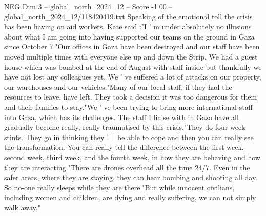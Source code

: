 \begin{textsample}{NEG Dim 3 – global\_north\_2024\_12 – Score -1.00 – global\_north\_2024\_12/118420419.txt}
Speaking of the emotional toll the crisis has been having on aid workers, Kate said :"I ' m under absolutely no illusions about what I am going into having supported our teams on the ground in Gaza since October 7."Our offices in Gaza have been destroyed and our staff have been moved multiple times with everyone else up and down the Strip.
We had a guest house which was bombed at the end of August with staff inside but thankfully we have not lost any colleagues yet.
We ' ve suffered a lot of attacks on our property, our warehouses and our vehicles."Many of our local staff, if they had the resources to leave, have left.
They took a decision it was too dangerous for them and their families to stay."We ' ve been trying to bring more international staff into Gaza, which has its challenges.
The staff I liaise with in Gaza have all gradually become really, really traumatised by this crisis."They do four-week stints.
They go in thinking they ' ll be able to cope and then you can really see the transformation.
You can really tell the difference between the first week, second week, third week, and the fourth week, in how they are behaving and how they are interacting."There are drones overhead all the time 24/7.
Even in the safer areas, where they are staying, they can hear bombing and shooting all day.
So no-one really sleeps while they are there."But while innocent civilians, including women and children, are dying and really suffering, we can not simply walk away."

\end{textsample}
